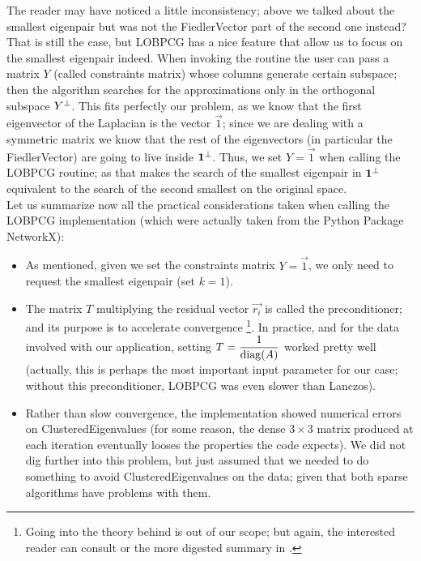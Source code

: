 The reader may have noticed a little inconsistency; above we talked about
the smallest eigenpair but was not the \gls{FiedlerVector} part of the
second one instead? That is still the case, but \gls{LOBPCG} has a nice
feature that allow us to focus on the smallest eigenpair indeed. When
invoking the routine the user can pass a matrix $Y$ (called
constraints matrix) whose columns
generate certain subspace; then the algorithm searches for the
approximations only in the orthogonal subspace ${Y}^{\bot}$. This fits
perfectly our problem, as we know that the first eigenvector of the
\gls{Laplacian} is the vector $\vec{1}$; since we are dealing with a
symmetric matrix we know that the rest of the eigenvectors (in
particular the \gls{FiedlerVector}) are going to live inside
${\mathbf{1}}^{\bot}$. Thus, we set $Y = \vec{1}$ when calling the \gls{LOBPCG}
routine; as that makes the search of the smallest eigenpair in
${\mathbf{1}}^{\bot}$ equivalent to the search of the second smallest on
the original space. \\

Let us summarize now all the practical considerations taken when
calling the \gls{LOBPCG} implementation (which were actually taken from the
Python Package NetworkX):

\begin{itemize}
\item As mentioned, given we set the constraints matrix $Y = \vec{1}$,
  we only need to request the smallest eigenpair (set $k=1$). 
\item The matrix $T$ multiplying the residual vector $\vec{r_i}$ is called
  the preconditioner; and its purpose is to accelerate
  convergence \footnote{Going into the theory behind is out of
    our scope; but again,  the interested reader can consult \cite{knyazev01}
    or the more digested summary in \cite{lashuk07}.}. In practice, and for the
  data involved with our application, setting $T =
  \dfrac{1}{\operatorname{diag}(A)}$ worked pretty well (actually, this is
  perhaps the most important input parameter for our case; without
  this preconditioner, \gls{LOBPCG} was even slower than Lanczos). 
\item Rather than slow convergence, the implementation showed
  numerical errors on \gls{ClusteredEigenvalues} (for some reason, the
  dense $3 \times 3$ matrix produced at each iteration eventually
  looses the properties the code expects). We did not dig further into
  this problem, but just assumed that we needed to do something to
  avoid \gls{ClusteredEigenvalues} on the data; given that both sparse
  algorithms have problems with them.
\end{itemize}

